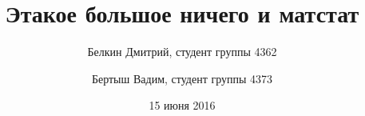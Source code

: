 \documentclass{article}
\begin{document}
\title{Этакое большое ничего и матстат}
\author{Белкин Дмитрий, студент группы 4362
\and Бертыш Вадим, студент группы 4373}
\date{15 июня 2016}
\maketitle
\newpage


\end{document}
